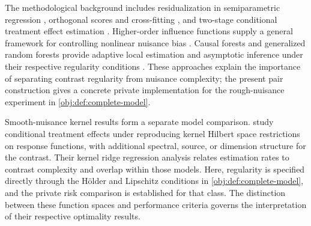 The methodological background includes residualization in semiparametric regression \citep{Robinson1988}, orthogonal scores and cross-fitting \citep{Chernozhukov2018}, and two-stage conditional treatment effect estimation \citep{Nie2021,Kennedy2023}. Higher-order influence functions supply a general framework for controlling nonlinear nuisance bias \citep{Robins2008}. Causal forests and generalized random forests provide adaptive local estimation and asymptotic inference under their respective regularity conditions \citep{WagerAthey2018,Athey2019}. These approaches explain the importance of separating contrast regularity from nuisance complexity; the present pair construction gives a concrete private implementation for the rough-nuisance experiment in \cref{obj:def:complete-model}.

Smooth-nuisance kernel results form a separate model comparison. \citet[][Sections 2, 5, and 6]{Kim2026} study conditional treatment effects under reproducing kernel Hilbert space restrictions on response functions, with additional spectral, source, or dimension structure for the contrast. Their kernel ridge regression analysis relates estimation rates to contrast complexity and overlap within those models. Here, regularity is specified directly through the H\"older and Lipschitz conditions in \cref{obj:def:complete-model}, and the private risk comparison is established for that class. The distinction between these function spaces and performance criteria governs the interpretation of their respective optimality results.

